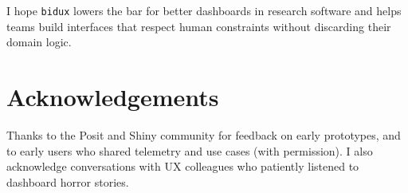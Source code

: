 \documentclass[
  authoryear,
  preprint]{elsarticle}
\begin{document}
I hope \texttt{bidux} lowers the bar for better dashboards in research
software and helps teams build interfaces that respect human constraints
without discarding their domain logic.

\section{Acknowledgements}\label{acknowledgements}

Thanks to the Posit and Shiny community for feedback on early
prototypes, and to early users who shared telemetry and use cases (with
permission). I also acknowledge conversations with UX colleagues who
patiently listened to dashboard horror stories.



\end{document}

